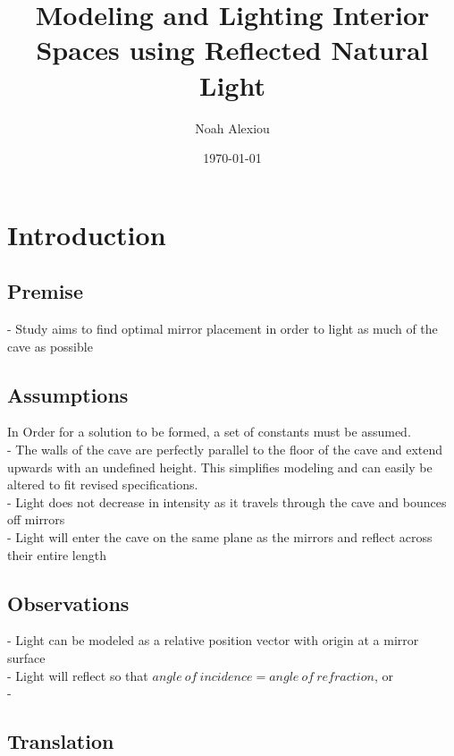 \documentclass[11pt, letterpaper]{article}
\begin{document}
\title{Modeling and Lighting Interior Spaces using Reflected Natural Light}
\author{Noah Alexiou}
\date{\today}
\maketitle
\newpage
\tableofcontents
\newpage


\section{Introduction}


\subsection{Premise}
- Study aims to find optimal mirror placement in order to light as much of the cave as possible




\subsection{Assumptions}
\par
In Order for a solution to be formed, a set of constants must be assumed.
\\
- The walls of the cave are perfectly parallel to the floor of the cave and extend upwards with an undefined height. This simplifies modeling and can easily be altered to fit revised specifications.
\\
- Light does not decrease in intensity as it travels through the cave and bounces off mirrors
\\
- Light will enter the cave on the same plane as the mirrors and reflect across their entire length
\\


\subsection{Observations}
\par

- Light can be modeled as a relative position vector with origin at a mirror surface
\\
- Light will reflect so that $angle \: of \:incidence = angle \: of \: refraction$, or 
\\
- 



\subsection{Translation}
\end{document}
